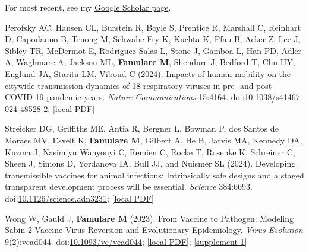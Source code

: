 \documentclass{article}
\begin{document}
\begin{llist}
\begin{items}
\end{items}

    
  \vspace{4pt}

\begin{items}

\item[{}] For most recent, see my \href{https://scholar.google.com/citations?hl=en\&user=TPWwr18AAAAJ\&view_op=list_works\&sortby=pubdate}{Google Scholar page}.

\item[{[34]}] Perofsky AC, Hansen CL, Burstein R, Boyle S, Prentice R, Marshall C, Reinhart D, Capodanno B, Truong M, Schwabe-Fry K, Kuchta K, Pfau B, Acker Z, Lee J, Sibley TR, McDermot E, Rodriguez-Salas L, Stone J, Gamboa L, Han PD, Adler A, Waghmare A, Jackson ML, \textbf{Famulare M}, Shendure J, Bedford T, Chu HY, Englund JA, Starita LM, Viboud C (2024). Impacts of human mobility on the citywide transmission dynamics of 18 respiratory viruses in pre- and post-COVID-19 pandemic years. \emph{Nature Communications} 15:4164. doi:\href{https://doi.org/10.1038/s41467-024-48528-2}{10.1038/s41467-024-48528-2}; \href{https://famulare.github.io/assets/publication-mirror/journal-34.pdf}{[local PDF]}

\item[{[33]}] Streicker DG, Griffiths ME, Antia R, Bergner L, Bowman P, dos Santos de Moraes MV, Esvelt K, \textbf{Famulare M}, Gilbert A, He B, Jarvis MA, Kennedy DA, Kuzma J, Nasimiyu Wanyonyi C, Remien C, Rocke T, Rosenke K, Schreiner C, Sheen J, Simons D, Yordanova IA, Bull JJ, and Nuismer SL (2024). Developing transmissible vaccines for animal infections: Intrinsically safe designs and a staged transparent development process will be essential. \emph{Science} 384:6693. doi:\href{https://doi.org/10.1126/science.adn3231}{10.1126/science.adn3231}; \href{https://famulare.github.io/assets/publication-mirror/journal-33.pdf}{[local PDF]}

\item[{[32]}] Wong W, Gauld J, \textbf{Famulare M} (2023). From Vaccine to Pathogen: Modeling Sabin 2 Vaccine Virus Reversion and Evolutionary Epidemiology. \emph{Virus Evolution} 9(2):vead044.
doi:\href{https://doi.org/10.1093/ve/vead044}{10.1093/ve/vead044}; \href{https://famulare.github.io/assets/publication-mirror/journal-32.pdf}{[local PDF]}; \href{https://famulare.github.io/assets/publication-mirror/supplements/journal-articles-32-vead044_supp.zip}{[supplement 1]}


\end{items}
\end{llist}
\end{document}

